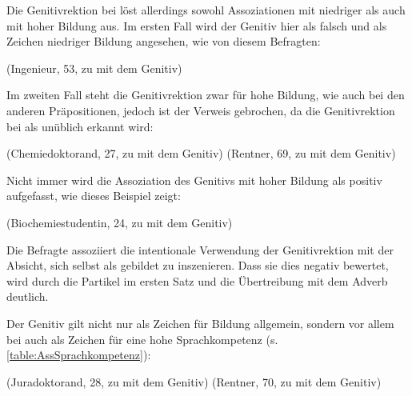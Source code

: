 Die Genitivrektion bei \gegenueber{} löst allerdings sowohl Assoziationen mit niedriger als auch mit hoher Bildung aus. 
Im ersten Fall wird der Genitiv hier als falsch und als Zeichen niedriger Bildung angesehen, wie von diesem Befragten: 
\begin{exe}
\ex {} (Ingenieur, 53, zu \gegenueber{} mit dem Genitiv)
\end{exe}
Im zweiten Fall steht die Genitivrektion zwar für hohe Bildung, wie auch bei den anderen Präpositionen, jedoch ist der Verweis gebrochen, da die Genitivrektion bei \gegenueber{} als unüblich erkannt wird: 
\begin{exe}
\ex {} (Chemiedoktorand, 27, zu \gegenueber{} mit dem Genitiv) 
\ex {} (Rentner, 69, zu \gegenueber{} mit dem Genitiv)
\end{exe}
Nicht immer wird die Assoziation des Genitivs mit hoher Bildung als positiv aufgefasst, wie dieses Beispiel zeigt: 
\begin{exe}
\ex {} (Biochemiestudentin, 24, zu \wegen{} mit dem Genitiv)
\end{exe}
Die Befragte assoziiert die intentionale Verwendung der Genitivrektion mit der Absicht, sich selbst als gebildet zu inszenieren.
Dass sie dies negativ bewertet, wird durch die Partikel  im ersten Satz und die Übertreibung mit dem Adverb  deutlich.  

Der Genitiv gilt nicht nur als Zeichen für Bildung allgemein, sondern vor allem bei \waehrend{} auch als Zeichen für eine hohe Sprachkompetenz (s. \autoref{table:AssSprachkompetenz}):
\begin{exe}
\ex {} (Juradoktorand, 28, zu \waehrend{} mit dem Genitiv)
\ex {} (Rentner, 70, zu \waehrend{} mit dem Genitiv) 
\end{exe}

